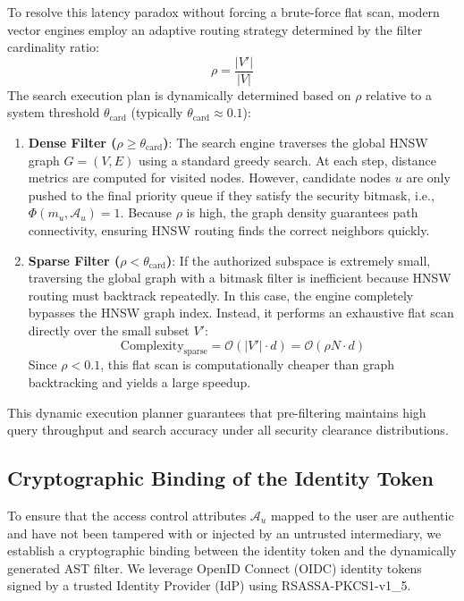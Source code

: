 \documentclass[sigconf]{acmart}
\begin{document}
To resolve this latency paradox without forcing a brute-force flat scan, modern vector engines employ an adaptive routing strategy determined by the filter cardinality ratio:
\begin{equation}
    \rho = \frac{|V'|}{|V|}
\end{equation}
The search execution plan is dynamically determined based on $\rho$ relative to a system threshold $\theta_{\text{card}}$ (typically $\theta_{\text{card}} \approx 0.1$):
\begin{enumerate}
    \item \textbf{Dense Filter ($\rho \ge \theta_{\text{card}}$)}: The search engine traverses the global HNSW graph $G = (V, E)$ using a standard greedy search. At each step, distance metrics are computed for visited nodes. However, candidate nodes $u$ are only pushed to the final priority queue if they satisfy the security bitmask, i.e., $\Phi(m_u, \mathcal{A}_u) = 1$. Because $\rho$ is high, the graph density guarantees path connectivity, ensuring HNSW routing finds the correct neighbors quickly.
    \item \textbf{Sparse Filter ($\rho < \theta_{\text{card}}$)}: If the authorized subspace is extremely small, traversing the global graph with a bitmask filter is inefficient because HNSW routing must backtrack repeatedly. In this case, the engine completely bypasses the HNSW graph index. Instead, it performs an exhaustive flat scan directly over the small subset $V'$:
    \begin{equation}
        \text{Complexity}_{\text{sparse}} = \mathcal{O}(|V'| \cdot d) = \mathcal{O}(\rho N \cdot d)
    \end{equation}
    Since $\rho < 0.1$, this flat scan is computationally cheaper than graph backtracking and yields a large speedup.
\end{enumerate}
This dynamic execution planner guarantees that pre-filtering maintains high query throughput and search accuracy under all security clearance distributions.

\subsection{Cryptographic Binding of the Identity Token}
To ensure that the access control attributes $\mathcal{A}_u$ mapped to the user are authentic and have not been tampered with or injected by an untrusted intermediary, we establish a cryptographic binding between the identity token and the dynamically generated AST filter. We leverage OpenID Connect (OIDC) identity tokens signed by a trusted Identity Provider (IdP) using RSASSA-PKCS1-v1\_5.
\end{document}
